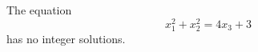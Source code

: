 \begin{proposition}\label{eq:027}
    The equation
\[
    x_1^2+x_2^2=4x_3+3
\]
    has no integer solutions.
\end{proposition}
